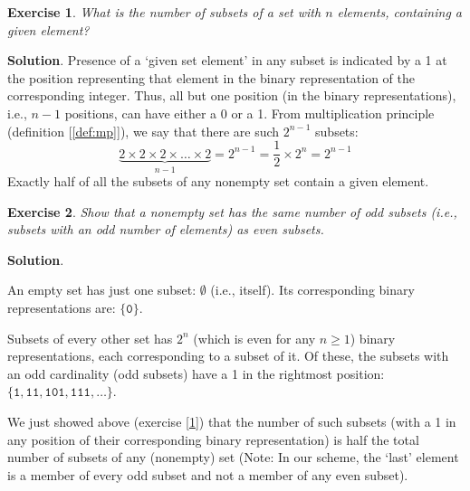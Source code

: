 \documentclass[11pt]{book}
\theoremstyle{definition}
\theoremstyle{plain}
\newtheorem{exercise}{Exercise}
\theoremstyle{definition}
\theoremstyle{problemstyle}
\theoremstyle{remark}
\theoremstyle{definition}
\begin{document}
\begin{exercise}
    What is the number of subsets of a set with $n$ elements, containing a given element?
    \label{ex:1.3.2}
\end{exercise}
\textbf{Solution}.
Presence of a `given set element' in any subset is indicated by a 1 at the position representing that element in the binary representation of the corresponding integer. Thus, all but one position (in the binary representations), i.e., $n-1$ positions, can have either a 0 or a 1. From multiplication principle (definition [\ref{def:mp}]), we say that there are such $2^{n-1}$ subsets:
\[
    \underbrace{2\times2\times2\times\dots\times2}_{n-1}=2^{n-1}=\frac{1}{2}\times2^n=2^{n-1}
\]
Exactly half of all the subsets of any nonempty set contain a given element.
\begin{exercise}
    Show that a nonempty set has the same number of odd subsets (i.e., subsets with an odd number of elements) as even subsets.
    \label{ex:1.3.3}
\end{exercise}
\textbf{Solution}.
\begin{mybox}
An empty set has just one subset: $\emptyset$ (i.e., itself). Its corresponding binary representations are: $\{\mathtt{0}\}$. 

Subsets of every other set has $2^n$ (which is even for any $n\geq1$) binary representations, each corresponding to a subset of it. Of these, the subsets with an odd cardinality (odd subsets) have a 1 in the rightmost position: $\{\mathtt{1,11,101,111,\dots}\}$. 

We just showed above (exercise [\ref{ex:1.3.2}]) that the number of such subsets (with a 1 in any position of their corresponding binary representation) is half the total number of subsets of any (nonempty) set (Note: In our scheme, the `last' element is a member of every odd subset and not a member of any even subset).
    \label{box:wrong-odd-even-subset-proof}
\end{mybox}
\end{document}
